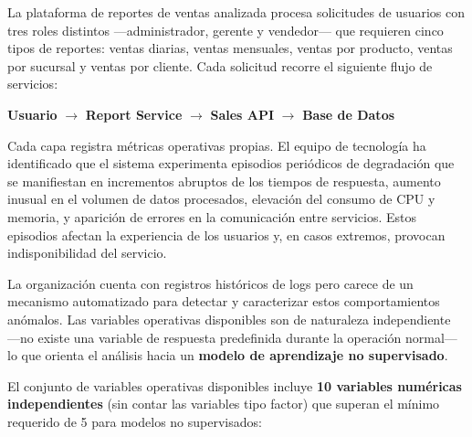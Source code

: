 \documentclass[12pt,letterpaper, oneside]{book}
\begin{document}
    La plataforma de reportes de ventas analizada procesa solicitudes de
    usuarios con tres roles distintos —administrador, gerente y vendedor—
    que requieren cinco tipos de reportes: ventas diarias, ventas mensuales,
    ventas por producto, ventas por sucursal y ventas por cliente. Cada
    solicitud recorre el siguiente flujo de servicios:

    \begin{center}
    \textbf{Usuario} $\rightarrow$ \textbf{Report Service} $\rightarrow$
    \textbf{Sales API} $\rightarrow$ \textbf{Base de Datos}
    \end{center}

    Cada capa registra métricas operativas propias. El equipo de tecnología
    ha identificado que el sistema experimenta episodios periódicos de
    degradación que se manifiestan en incrementos abruptos de los tiempos
    de respuesta, aumento inusual en el volumen de datos procesados,
    elevación del consumo de CPU y memoria, y aparición de errores en la
    comunicación entre servicios. Estos episodios afectan la experiencia
    de los usuarios y, en casos extremos, provocan indisponibilidad del
    servicio.

    La organización cuenta con registros históricos de logs pero carece
    de un mecanismo automatizado para detectar y caracterizar estos
    comportamientos anómalos. Las variables operativas disponibles son
    de naturaleza independiente —no existe una variable de respuesta
    predefinida durante la operación normal— lo que orienta el análisis
    hacia un \textbf{modelo de aprendizaje no supervisado}.

    El conjunto de variables operativas disponibles incluye \textbf{10
    variables numéricas independientes} (sin contar las variables tipo
    factor) que superan el mínimo requerido de 5 para modelos no
    supervisados:
\end{document}
